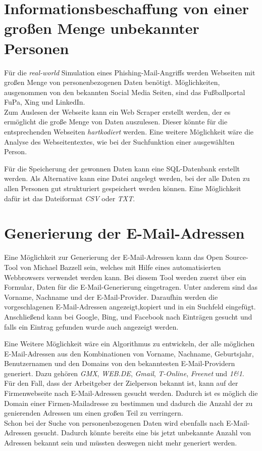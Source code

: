 \section{Informationsbeschaffung von einer großen Menge unbekannter Personen}
Für die \textit{real-world} Simulation eines Phishing-Mail-Angriffs werden Webseiten mit großen Menge von personenbezogenen Daten benötigt. Möglichkeiten, ausgenommen von den bekannten Social Media Seiten, sind das Fußballportal FuPa, Xing und LinkedIn.\\
Zum Auslesen der Webseite kann ein Web Scraper erstellt werden, der es ermöglicht die große Menge von Daten auszulesen. Dieser könnte für die entsprechenden Webseiten \textit{hartkodiert} werden. Eine weitere Möglichkeit wäre die Analyse des Webseitentextes, wie bei der Suchfunktion einer ausgewählten Person.

Für die Speicherung der gewonnen Daten kann eine SQL-Datenbank erstellt werden.
Als Alternative kann eine Datei angelegt werden, bei der alle Daten zu allen Personen gut strukturiert gespeichert werden können. Eine Möglichkeit dafür ist das Dateiformat \textit{CSV} oder \textit{TXT}.%


\section{Generierung der E-Mail-Adressen}
Eine Möglichkeit zur Generierung der E-Mail-Adressen kann das Open Source-Tool von Michael Bazzell \cite{EmailAssumptions} sein, welches mit Hilfe eines automatisierten Webbrowsers verwendet werden kann. Bei diesem Tool werden zuerst über ein Formular, Daten für die E-Mail-Generierung eingetragen. Unter anderem sind das Vorname, Nachname und der E-Mail-Provider. Daraufhin werden die vorgeschlagenen E-Mail-Adressen angezeigt,kopiert und in ein Suchfeld eingefügt. Anschließend kann bei Google, Bing, und Facebook nach Einträgen gesucht und falls ein Eintrag gefunden wurde auch angezeigt werden.

Eine Weitere Möglichkeit wäre ein Algorithmus zu entwickeln, der alle möglichen E-Mail-Adressen aus den Kombinationen von Vorname, Nachname, Geburtsjahr, Benutzernamen und den Domains von den bekanntesten E-Mail-Providern generiert. Dazu gehören \textit{GMX}, \textit{WEB.DE}, \textit{Gmail}, \textit{T-Online}, \textit{Freenet} und \textit{1\&1}.\cite{AnbieterMail} \\
Für den Fall, dass der Arbeitgeber der Zielperson bekannt ist, kann auf der Firmenwebseite nach E-Mail-Adressen gesucht werden. Dadurch ist es möglich die Domain einer Firmen-Mailadresse zu bestimmen und dadurch die Anzahl der zu genierenden Adressen um einen großen Teil zu verringern.\\
Schon bei der Suche von personenbezogenen Daten wird ebenfalls nach E-Mail-Adressen gesucht. Dadurch könnte bereits eine bis jetzt unbekannte Anzahl von Adressen bekannt sein und müssten deswegen nicht mehr generiert werden.

